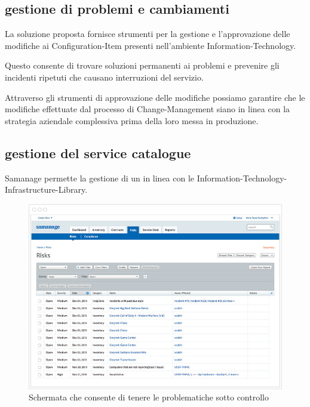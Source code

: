\subsection[Gestione di problemi e cambiamenti]{gestione di problemi e cambiamenti}
\label{sd-problem-change-management}
La soluzione  proposta fornisce strumenti per la gestione e l'approvazione delle modifiche ai \ac{Configuration-Item} presenti nell'ambiente \acs{Information-Technology}.

Questo consente di trovare soluzioni permanenti ai problemi e prevenire gli incidenti ripetuti che causano interruzioni del servizio.

Attraverso gli strumenti di approvazione delle modifiche possiamo garantire che le modifiche effettuate dal processo di \ac{Change-Management} siano in linea con la strategia aziendale complessiva prima della loro messa in produzione.

\subsection[Gestione del service catalogue]{gestione del service catalogue}
\label{sd-service-catalogue-management}
Samanage permette la gestione di un  in linea con le  \ac{Information-Technology-Infrastructure-Library}.

\begin{figure}[htbp]
\centering
\includegraphics[scale=0.6]{Images/samanage/Risk_management.png}
\caption{Schermata che consente di tenere le problematiche sotto controllo}
\label{sd-samanage-risk-management-img}
\end{figure}

